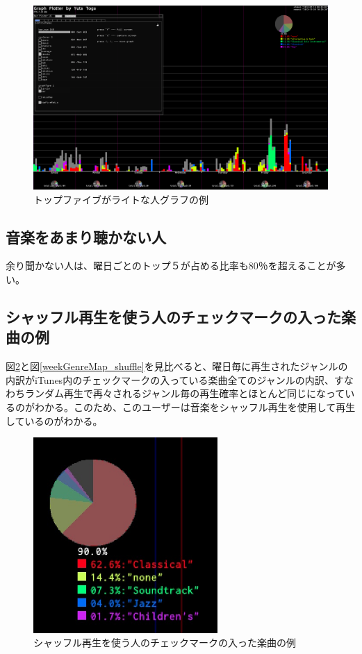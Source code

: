 \documentclass{jsarticle}
\begin{document}
\begin{figure}[h]
\begin{center}
\includegraphics[width=14cm]{topFive_light.png}
\caption{トップファイブがライトな人グラフの例}
\label{topFive_heavy}
\end{center}
\end{figure}

\subsection{音楽をあまり聴かない人}
余り聞かない人は、曜日ごとのトップ５が占める比率も80％を超えることが多い。

\subsection{シャッフル再生を使う人のチェックマークの入った楽曲の例}
図\ref{checkedItemsGenreMap_shuffle}と図\ref{weekGenreMap_shuffle}を見比べると、曜日毎に再生されたジャンルの内訳がiTunes内のチェックマークの入っている楽曲全てのジャンルの内訳、すなわちランダム再生で再々されるジャンル毎の再生確率とほとんど同じになっているのがわかる。このため、このユーザーは音楽をシャッフル再生を使用して再生しているのがわかる。

\begin{figure}[h]
\begin{center}
\includegraphics[width=7cm]{taru_checkedItemGenreRatio.jpg}
\caption{シャッフル再生を使う人のチェックマークの入った楽曲の例}
\label{checkedItemsGenreMap_shuffle}
\end{center}
\end{figure}
\end{document}
